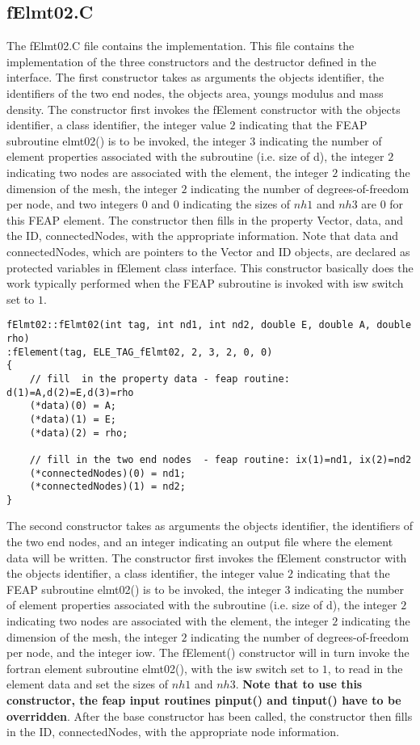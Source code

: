 \documentclass[12pt]{article}
\begin{document}
\subsection {\sf fElmt02.C}
The {\sf fElmt02.C} file contains the implementation. This file
contains the implementation of the three constructors and the destructor
defined in the interface. The first constructor takes as arguments
the objects identifier, the identifiers of the two end nodes, 
the objects area, youngs modulus and mass density. The constructor
first invokes the fElement constructor with the objects identifier, a
class identifier, the integer value $2$ indicating that the FEAP subroutine
elmt02() is to be invoked, the integer $3$ indicating the number of
element properties associated with the subroutine (i.e. size of d),
the integer $2$ indicating two nodes are associated with the
element, the integer $2$ indicating the dimension of the mesh, the
integer $2$ indicating the number of degrees-of-freedom per node, and
two integers $0$ and $0$ indicating the sizes of $nh1$ 
and $nh3$ are $0$ for this FEAP element. The constructor then fills in
the property Vector, data, and the ID, connectedNodes, with the
appropriate information. Note that data and connectedNodes, which are
pointers to the Vector and ID objects, are declared as protected
variables in fElement class interface. This constructor basically does
the work typically performed when the FEAP subroutine is invoked with
isw switch set to $1$. 

{\sf\small \begin{verbatim}
fElmt02::fElmt02(int tag, int nd1, int nd2, double E, double A, double rho)
:fElement(tag, ELE_TAG_fElmt02, 2, 3, 2, 0, 0)
{
    // fill  in the property data - feap routine: d(1)=A,d(2)=E,d(3)=rho
    (*data)(0) = A;       
    (*data)(1) = E;
    (*data)(2) = rho;

    // fill in the two end nodes  - feap routine: ix(1)=nd1, ix(2)=nd2
    (*connectedNodes)(0) = nd1; 
    (*connectedNodes)(1) = nd2;   
}
\end{verbatim}}


The second constructor takes as arguments
the objects identifier, the identifiers of the two end nodes, and an
integer indicating an output file where the element data will be written.
The constructor first invokes the fElement constructor with the
objects identifier, a 
class identifier, the integer value $2$ indicating that the FEAP subroutine
elmt02() is to be invoked, the integer $3$ indicating the number of
element properties associated with the subroutine (i.e. size of d),
the integer $2$ indicating two nodes are associated with the
element, the integer $2$ indicating the dimension of the mesh, the
integer $2$ indicating the number of degrees-of-freedom per node, and
the integer iow. The fElement() constructor will in turn invoke the
fortran element subroutine elmt02(), with the isw switch set to
$1$, to read in the element data and set the sizes of $nh1$ and
$nh3$. {\bf Note that to use this 
constructor, the feap input routines pinput() and  tinput()
have to be overridden}. After the base constructor has been called,
the constructor then fills in the ID, connectedNodes, with the
appropriate node information.  
\end{document}
